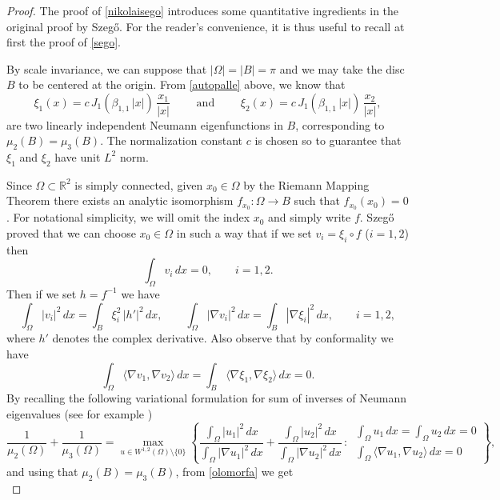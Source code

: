 \documentclass{amsart}
\theoremstyle{definition}
\numberwithin{equation}{section}
\begin{document}
\begin{proof}
The proof of \eqref{nikolaisego} introduces some quantitative ingredients in the original proof by Szeg\H{o}. 
For the reader's convenience, it is thus useful to recall at first the proof of \eqref{sego}.
\par
By scale invariance, we can suppose that $|\Omega|=|B|=\pi$ and we may take the disc $B$ to be centered at the origin.
From \eqref{autopalle} above, we know that 
\[
\xi_1(x)=c\,J_{1}(\beta_{1,1}\,|x|)\,\frac{x_1}{|x|}\qquad \mbox{ and }\qquad \xi_2(x)=c\,J_{1}(\beta_{1,1}\,|x|)\,\frac{x_2}{|x|},
\]
are two linearly independent Neumann eigenfunctions in $B$, corresponding to $\mu_2(B)=\mu_3(B)$. The normalization constant $c$ is chosen so to guarantee that $\xi_1$ and $\xi_2$ have unit $L^2$ norm.
\par
Since $\Omega\subset\mathbb{R}^2$ is simply connected, given $x_0\in \Omega$ by the Riemann Mapping Theorem there exists an analytic isomorphism $f_{x_0}:\Omega\to B$ such that $f_{x_0}(x_0)=0$. For notational simplicity, we will omit the index $x_0$ and simply write $f$. Szeg\H{o} proved that we can choose $x_0\in\Omega$ in such a way that if we set $v_i=\xi_i\circ f$ ($i=1,2$) then
\[
\int_\Omega v_i\,dx=0,\qquad i=1,2.
\]
Then if we set $h=f^{-1}$ we have 
\begin{equation}
\label{olomorfa}
\int_\Omega |v_i|^2\,dx=\int_B \xi_i^2\,|h'|^2\,dx,\qquad \int_\Omega |\nabla v_i|^2\,dx=\int_B |\nabla \xi_i|^2\,dx,\qquad i=1,2,
\end{equation}
where $h'$ denotes the complex derivative. Also observe that by conformality we have
\[
\int_\Omega \langle \nabla v_1,\nabla v_2\rangle\,dx=\int_B \langle \nabla \xi_1,\nabla \xi_2\rangle\,dx=0.
\]
By recalling the following variational formulation for sum of inverses of Neumann eigenvalues (see for example \cite[Theorem 1]{MR1251868})
\[
\frac{1}{\mu_2(\Omega)}+\frac{1}{\mu_3(\Omega)}=\max_{u\in W^{1,2}(\Omega)\setminus\{0\}}\left\{\frac{\displaystyle\int_\Omega |u_1|^2\,dx}{\displaystyle \int_\Omega |\nabla u_1|^2\,dx}+\frac{\displaystyle\int_\Omega |u_2|^2\,dx}{\displaystyle \int_\Omega |\nabla u_2|^2\,dx}\, :\, \begin{array}{c}\displaystyle \int_{\Omega} u_1\,dx=\int_\Omega u_2\,dx=0\\
\displaystyle\int_\Omega \langle \nabla u_1,\nabla u_2\rangle\,dx=0
\end{array}\right\},
\]
and using that $\mu_2(B)=\mu_3(B)$, from \eqref{olomorfa} we get
\begin{equation}

\end{equation}
\end{proof}
\end{document}
